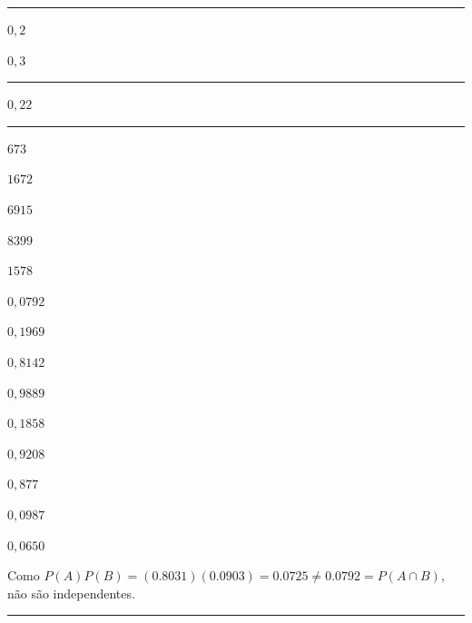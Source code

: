 \documentclass[a4paper,11pt,fleqn]{article}\usepackage[]{graphicx}\usepackage[]{color}
\theoremstyle{definition}
\begin{document}
\begin{compactenum}
\vspace{0.3cm}
\hrule
\vspace{0.3cm}

\item
  \begin{inparaenum}
  \item $0,2$ \,
  \item $0,3$
  \end{inparaenum}

\vspace{0.3cm}
\hrule
\vspace{0.3cm}

\item $0,22$

\vspace{0.3cm}
\hrule
\vspace{0.3cm}


\item
  \begin{compactenum}
  \item
    \begin{inparaenum}
    \item $673$ \,
    \item $1672$ \,
    \item $6915$ \,
    \item $8399$ \,
    \item $1578$
    \end{inparaenum}
  \item
    \begin{inparaenum}
    \item $0,0792$ \,
    \item $0,1969$ \,
    \item $0,8142$ \,
    \item $0,9889$ \,
    \item $0,1858$ \,
    \item $0,9208$ \,
    \item $0,877$
    \end{inparaenum}
  \item $0,0987$
  \item $0,0650$
  \item Como $P(A)P(B) = (0.8031)(0.0903) = 0.0725 \neq 0.0792 = P(A
    \cap B)$, não são independentes.
  \end{compactenum}

\vspace{0.3cm}
\hrule
\vspace{0.3cm}


\end{compactenum}
\end{document}
